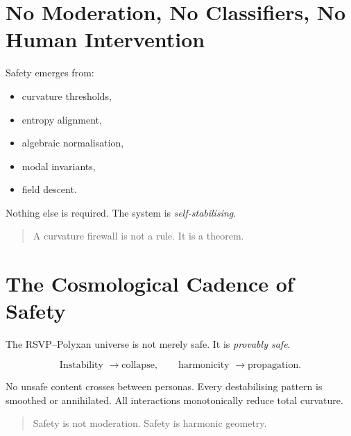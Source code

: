 \section{No Moderation, No Classifiers, No Human Intervention}

Safety emerges from:

\begin{itemize}
    \item curvature thresholds,
    \item entropy alignment,
    \item algebraic normalisation,
    \item modal invariants,
    \item field descent.
\end{itemize}

Nothing else is required.
The system is \emph{self-stabilising}.

\begin{quote}
A curvature firewall is not a rule.  
It is a theorem.
\end{quote}

\section{The Cosmological Cadence of Safety}

The RSVP–Polyxan universe is not merely safe.
It is \emph{provably safe}.

\[
\text{Instability } \longrightarrow \text{collapse}, \qquad
\text{harmonicity } \longrightarrow \text{propagation}.
\]

No unsafe content crosses between personas.
Every destabilising pattern is smoothed or annihilated.
All interactions monotonically reduce total curvature.

\begin{quote}
Safety is not moderation.  
Safety is harmonic geometry.
\end{quote}
